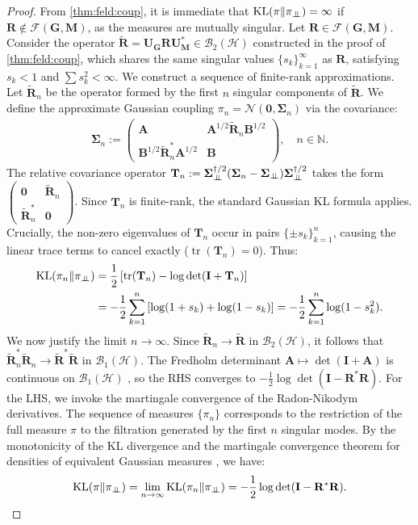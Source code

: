 \documentclass[noinfoline]{imsart}\setcounter{tocdepth}{2}
\renewcommand{\b}[1]{\mathbb{#1}}
\newcommand{\m}[1]{\mathbf{#1}}
\renewcommand{\c}[1]{\mathcal{#1}}
\newcommand{\indep}{\perp\mkern-9.5mu\perp}
\DeclareMathOperator{\tr}{tr}
\DeclareMathOperator{\KL}{KL}
\theoremstyle{plain}
\begin{document}
\begin{proof}
From \cref{thm:feld:coup}, it is immediate that $\KL(\pi \| \pi_{\indep}) = \infty$ if $\m{R} \notin \c{F}(\m{G}, \m{M})$, as the measures are mutually singular. 
Let $\m{R} \in \c{F}(\m{G}, \m{M})$. Consider the operator $\tilde{\m{R}} = \m{U}_{\m{G}} \m{R} \m{U}_{\m{M}}^* \in \c{B}_{2}(\c{H})$ constructed in the proof of \cref{thm:feld:coup}, which shares the same singular values $\{s_k\}_{k=1}^\infty$ as $\m{R}$, satisfying $s_{k} < 1$ and $\sum s_k^2 < \infty$.
We construct a sequence of finite-rank approximations. Let $\tilde{\m{R}}_n$ be the operator formed by the first $n$ singular components of $\tilde{\m{R}}$. We define the approximate Gaussian coupling $\pi_n = \c{N}(\m{0}, \m{\Sigma}_n)$ via the covariance:
\begin{align*}
    \m{\Sigma}_{n} := \left(
    \begin{array}{c|c}
    \m{A} & \m{A}^{1/2} \tilde{\m{R}}_n \m{B}^{1/2} \\
    \hline
    \m{B}^{1/2} \tilde{\m{R}}_n^* \m{A}^{1/2} & \m{B}
    \end{array}
    \right), \quad n \in \b{N}.
\end{align*}
The relative covariance operator $\m{T}_n := \m{\Sigma}_{\indep}^{\dagger/2} (\m{\Sigma}_{n} - \m{\Sigma}_{\indep}) \m{\Sigma}_{\indep}^{\dagger/2}$ takes the form $\left(\begin{smallmatrix} \m{0} & \tilde{\m{R}}_n \\ \tilde{\m{R}}_n^* & \m{0} \end{smallmatrix}\right)$.
Since $\m{T}_n$ is finite-rank, the standard Gaussian KL formula applies. Crucially, the non-zero eigenvalues of $\m{T}_n$ occur in pairs $\{\pm s_k\}_{k=1}^n$, causing the linear trace terms to cancel exactly ($\tr(\m{T}_n) = 0$). Thus:
\begin{align*}
    \KL(\pi_{n} \| \pi_{\indep}) &= \frac{1}{2} \left[ \tr(\m{T}_n) - \log \det(\m{I} + \m{T}_n) \right] \\
    &= -\frac{1}{2} \sum_{k=1}^n \left[ \log(1+s_k) + \log(1-s_k) \right] = -\frac{1}{2} \sum_{k=1}^n \log(1 - s_k^2).
\end{align*}
We now justify the limit $n \to \infty$. 
Since $\tilde{\m{R}}_n \to \tilde{\m{R}}$ in $\c{B}_2(\c{H})$, it follows that $\tilde{\m{R}}_n^* \tilde{\m{R}}_n \to \tilde{\m{R}}^* \tilde{\m{R}}$ in $\c{B}_1(\c{H})$. The Fredholm determinant $\m{A} \mapsto \det(\m{I} + \m{A})$ is continuous on $\c{B}_1(\c{H})$ \cite{gohberg2012traces}, so the RHS converges to $-\frac{1}{2} \log \det(\m{I} - \m{R}^* \m{R})$.
For the LHS, we invoke the martingale convergence of the Radon-Nikodym derivatives. The sequence of measures $\{\pi_n\}$ corresponds to the restriction of the full measure $\pi$ to the filtration generated by the first $n$ singular modes. By the monotonicity of the KL divergence and the martingale convergence theorem for densities of equivalent Gaussian measures \cite{bogachev1998gaussian}, we have:
\begin{align*}
    \KL(\pi \| \pi_{\indep}) = \lim_{n \to \infty} \KL(\pi_{n} \| \pi_{\indep}) = -\frac{1}{2} \log \det (\m{I} - \m{R}^* \m{R}).
\end{align*}
\end{proof}
\end{document}
